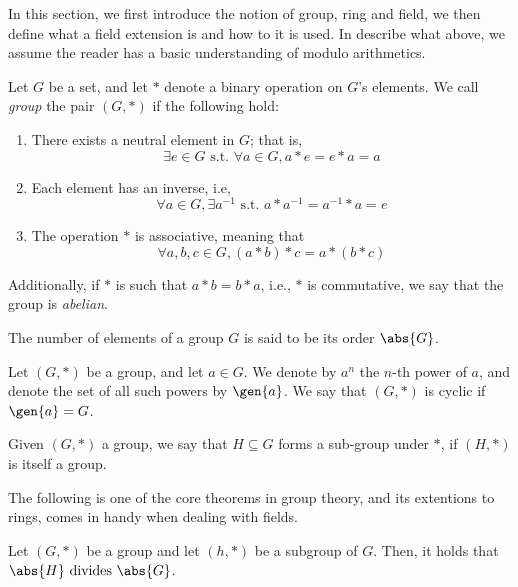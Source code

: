 \documentclass{subfiles}
\begin{document}
    In this section, we first introduce the notion of group, ring and field,
        we then define what a field extension is and how to it is used. 
        In describe what above, we assume the reader has a basic understanding of 
        modulo arithmetics.

    \begin{definition*}[Group]
    Let \(G\) be a set, and let \(*\) denote a binary operation on \(G\)'s elements.
        We call \emph{group} the pair \((G, *)\) if the following hold:
        \begin{enumerate}
            \item There exists a neutral element in \(G\);
                that is, 
                \[
                    \exists e \in G \text{ s.t. } \forall a \in G, a * e = e * a = a
                \]
            \item Each element has an inverse, i.e, 
                \[
                    \forall a \in G, \exists a^{-1} \text{ s.t. } a * a^{-1} = a^{-1} * a = e 
                \]
            \item The operation \(*\) is associative, meaning that 
                \[
                    \forall a, b, c \in G, (a * b) * c = a * (b * c)
                \]
        \end{enumerate}
        Additionally, if \(*\) is such that \(a * b = b * a\), i.e., 
            \(*\) is commutative, we say that the group is \emph{abelian}.
    \end{definition*}
    The number of elements of a group \(G\) is said to be its order \(\abs{G}\).

    \begin{definition*}
        Let \((G, *)\) be a group, and let \(a \in G\). We denote by \(a^{n}\)
            the \(n\)-th power of \(a\), and denote the set of all such powers by 
            \(\gen{a}\). We say that \((G, *)\) is cyclic if \(\gen{a} = G\).
    \end{definition*}

    \begin{definition*}
        Given \((G, *)\) a group, we say that \(H \subseteq G\) forms a sub-group
            under \(*\), if \((H, *)\) is itself a group.
    \end{definition*}

    The following is one of the core theorems in group theory,
        and its extentions to rings, comes in handy when dealing with fields.
        \begin{theorem*}
            Let \((G, *)\) be a group and let \((h, *)\) be a subgroup of \(G\).
            Then, it holds that \(\abs{H} \text{ divides } \abs{G}\).
        \end{theorem*}
\end{document}
